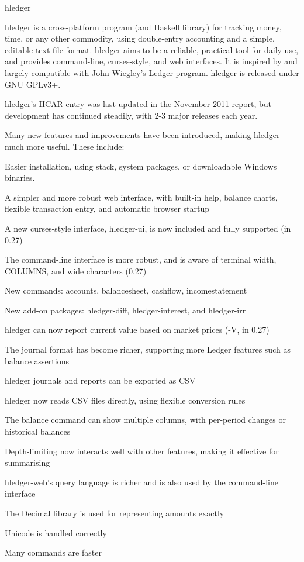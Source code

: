 \documentclass[DIV16,twocolumn,10pt]{scrreprt}
\begin{document}
\begin{hcarentry}{hledger}
\makeheader


hledger is a cross-platform program (and Haskell library) for tracking
money, time, or any other commodity, using double-entry accounting and
a simple, editable text file format.  
hledger aims to be a reliable, practical tool for daily use,
and provides command-line, curses-style, and web interfaces.
It is inspired by and largely compatible with John Wiegley's Ledger program.  
hledger is released under GNU GPLv3+.


hledger's HCAR entry was last updated in the November 2011 report, but
development has continued steadily, with 2-3 major releases each year.

Many new features and improvements have been introduced, making hledger much more useful.
These include:
\begin{compactitem}
\item Easier installation, using stack, system packages, or downloadable Windows binaries.
\item A simpler and more robust web interface, with built-in help, balance charts, flexible transaction entry, and automatic browser startup
\item A new curses-style interface, hledger-ui, is now included and fully supported (in 0.27)
\item The command-line interface is more robust, and is aware of terminal width, COLUMNS, and wide characters (0.27)
\item New commands: accounts, balancesheet, cashflow, incomestatement
\item New add-on packages: hledger-diff, hledger-interest, and hledger-irr
\item hledger can now report current value based on market prices (-V, in 0.27)
\item The journal format has become richer, supporting more Ledger features such as balance assertions
\item hledger journals and reports can be exported as CSV
\item hledger now reads CSV files directly, using flexible conversion rules
\item The balance command can show multiple columns, with per-period changes or historical balances
\item Depth-limiting now interacts well with other features, making it effective for summarising
\item hledger-web's query language is richer and is also used by the command-line interface
\item The Decimal library is used for representing amounts exactly
\item Unicode is handled correctly
\item Many commands are faster
\end{compactitem}


\end{hcarentry}
\end{document}
